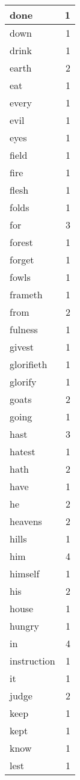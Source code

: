 \begin{center}
\begin{longtable}{l|r}
done & 1 \\ \hline
down & 1 \\ \hline
drink & 1 \\ \hline
earth & 2 \\ \hline
eat & 1 \\ \hline
every & 1 \\ \hline
evil & 1 \\ \hline
eyes & 1 \\ \hline
field & 1 \\ \hline
fire & 1 \\ \hline
flesh & 1 \\ \hline
folds & 1 \\ \hline
for & 3 \\ \hline
forest & 1 \\ \hline
forget & 1 \\ \hline
fowls & 1 \\ \hline
frameth & 1 \\ \hline
from & 2 \\ \hline
fulness & 1 \\ \hline
givest & 1 \\ \hline
glorifieth & 1 \\ \hline
glorify & 1 \\ \hline
goats & 2 \\ \hline
going & 1 \\ \hline
hast & 3 \\ \hline
hatest & 1 \\ \hline
hath & 2 \\ \hline
have & 1 \\ \hline
he & 2 \\ \hline
heavens & 2 \\ \hline
hills & 1 \\ \hline
him & 4 \\ \hline
himself & 1 \\ \hline
his & 2 \\ \hline
house & 1 \\ \hline
hungry & 1 \\ \hline
in & 4 \\ \hline
instruction & 1 \\ \hline
it & 1 \\ \hline
judge & 2 \\ \hline
keep & 1 \\ \hline
kept & 1 \\ \hline
know & 1 \\ \hline
lest & 1 \\ \hline

\end{longtable}
\end{center}
